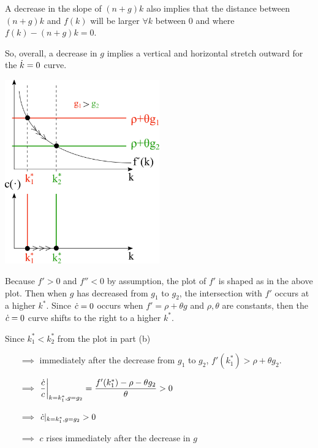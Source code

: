 \documentclass[12pt]{article}
\begin{document}
A decrease in the slope of $(n+g)k$ also implies that the distance between $(n+g)k$ and $f(k)$ will be larger $\forall k$ between 0 and where $f(k)-(n+g)k=0$.

\noindent
So, overall, a decrease in $g$ implies a vertical and horizontal stretch outward for the $\dot k = 0$ curve.


\newpage{}

\includegraphics[width=0.5\textwidth]{1.b}

Because $f'>0$ and $f''<0$ by assumption, the plot of $f'$ is shaped as in the above plot. Then when $g$ has decreased from $g_1$ to $g_2$, the intersection with $f'$ occurs at a higher $k^*$. Since $\dot c=0$ occurs when $f'=\rho+\theta g$ and $\rho, \theta$ are constants, then the $\dot c=0$ curve shifts to the right to a higher $k^*$.
  

\newpage{}

Since $k_1^* < k_2^*$ from the plot in part (b)
\begin{itemize}
    \item[$\implies$] immediately after the decrease from $g_1$ to $g_2$, $f'(k_1^*)>\rho+\theta g_2$.
    \item[$\implies$] $\dfrac{\dot c}{c}\bigg|_{k=k_1^*,g=g_2} = \dfrac{f'(k_1^*) - \rho - \theta g_2}{\theta} > 0$
    \item[$\implies$] $\dot c|_{k=k_1^*,g=g_2} > 0$
    \item[$\implies$] $c$ rises immediately after the decrease in $g$
\end{itemize}
\end{document}
